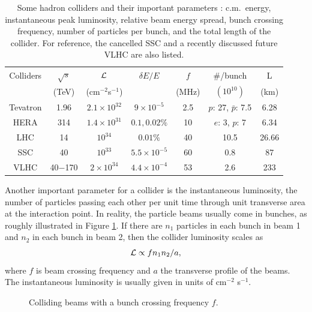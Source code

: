 \documentclass[12pt,prd,aps,floats,preprintnumbers,preprint,superscriptaddress,floatfix,nofootinbib]{revtex4}
\def\be{\begin{equation}}
\def\ee{\end{equation}}
\begin{document}
%
\begin{table}[tb]
    \begin{tabular}[t]{|c| c | c | c |c|c|c|}
       \hline
        Colliders  & $\sqrt s$& ${\cal{L}}$& $\delta E/E$ & $f$ & $\#$/bunch & L\\
          & (TeV) &  (cm$^{-2}$s$^{-1}$)&  & (MHz)& $(10^{10})$ & (km)\\
        \hline        \hline
        Tevatron & 1.96   &     $2.1\times 10^{32}$   &  $9\times 10^{-5}$  & 2.5 & $p$: 27, 
        $\bar p$: 7.5& 6.28\\
        HERA &  314  & $1.4\times 10^{31}$   &  $0.1,0.02\%$ &10  & $e$: 3, $p$: 7& 6.34 \\
        \hline    \hline
        LHC & 14   &   $10^{34}$   & $0.01\%$ & 40 & 10.5& 26.66\\        
        \hline
         SSC & 40   &   $10^{33}$   & $5.5\times 10^{-5}$ & 60 & 0.8 & 87\\        
        VLHC    & 40$-$170  & $2\times10^{34}$ & $4.4\times 10^{-4}$ & 53 & 2.6 & 233 \\
\hline
    \end{tabular}
\caption{Some hadron colliders and their important parameters 
{\protect \cite{PDG}}: c.m.~energy, instantaneous
peak luminosity, relative beam energy spread, bunch crossing frequency, 
number of particles per bunch, and the total length of the collider. For
reference, the cancelled SSC and a recently discussed future VLHC {\protect \cite{vlhc}}
are also listed. }
\label{hcolliders} 
\end{table}

Another important parameter for a collider is the instantaneous luminosity, 
the number of particles passing each other  per unit time through unit 
transverse area at the interaction point.  In reality, 
the particle  beams usually come in bunches, as roughly illustrated in
Figure \ref{fig:collider}. If there are $n_1$ particles in each bunch
in beam 1 and $n_2$ in each bunch in beam 2, then the collider luminosity scales as
\be
{\cal{L}} \propto f n_1 n_2/a,
\ee
where $f$ is beam crossing frequency and $a$ the transverse profile of the 
beams. The instantaneous luminosity is usually given in units of cm$^{-2}$ s$^{-1}$. 

\begin{figure}[h]
\caption{Colliding beams  with a bunch crossing frequency $f$.
\label{fig:collider}}
\end{figure}
\end{document}
